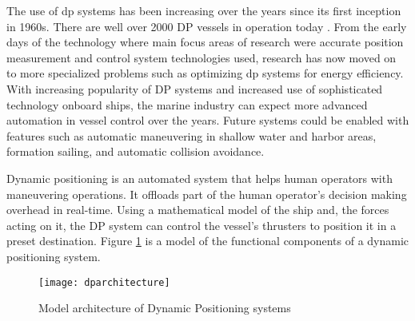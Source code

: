 The use of dp systems has been increasing over the years since its first inception in 1960s. There are well over 2000 DP vessels in operation today \citep{sorensen2011survey}. From the early days of the technology where main focus areas of research were accurate position measurement and control system technologies used, research has now moved on to more specialized problems such as optimizing dp systems for energy efficiency. With increasing popularity of DP systems and increased use of sophisticated technology onboard ships, the marine industry can expect more advanced automation in vessel control over the years. Future systems could be enabled with features such as automatic maneuvering in shallow water and harbor areas, formation sailing, and automatic collision avoidance.




Dynamic positioning is an automated system that helps human operators with maneuvering operations. It offloads part of the human operator's decision making overhead in real-time. Using a mathematical model of the ship and, the forces acting on it, the DP system can control the vessel's thrusters to position it in a preset destination. Figure \ref{fig:dparchitecture} is a model of the functional components of a dynamic positioning system. 
\begin{figure}
	\centering
	\texttt{[image: dparchitecture]}
	\caption{Model architecture of Dynamic Positioning systems}
	\label{fig:dparchitecture}
\end{figure}



